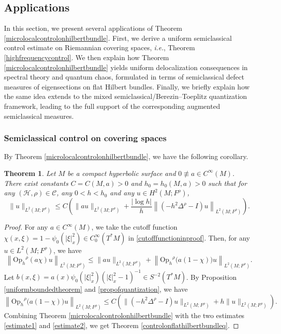 \documentclass[11pt,oneside,reqno]{amsart}
\newcommand\Oph{\ensuremath{\mathrm{Op}_h}}
\newtheorem{theorem}{Theorem}[section]
\theoremstyle{definition}
\numberwithin{equation}{section}
\theoremstyle{plain}
\begin{document}
\subsection{Applications}\label{subsec:application}

In this section, we present several applications of Theorem \ref{microlocalcontrolonhilbertbundle}. 
First, we derive a uniform semiclassical control estimate on Riemannian covering spaces, \emph{i.e.}, Theorem \ref{highfrequencycontrol}. 
We then explain how Theorem \ref{microlocalcontrolonhilbertbundle} yields uniform delocalization consequences in spectral theory and quantum chaos, formulated in terms of semiclassical defect measures of eigensections on flat Hilbert bundles. 
Finally, we briefly explain how the same idea extends to the mixed semiclassical/Berezin–Toeplitz quantization framework, leading to the full support of the corresponding augmented semiclassical measures.


\subsubsection{Semiclassical control on covering spaces}

By Theorem \ref{microlocalcontrolonhilbertbundle}, we have the following corollary.


\begin{theorem}\label{controlonflathilbertbundle}
Let $M$ be a compact hyperbolic surface and $0\not \equiv a \in C^{\infty}(M)$. There exist constants $C=C(M,a)>0$ and $h_{0}  = h_0(M,a)>0$ such that for any $(\mathcal{H},\rho)\in \mathcal{C}$, any $0<h<h_{0}$ and any $u \in H^2(M;F^{\rho})$,
\begin{equation}\label{controlonflathilbertbundleq}
\|u\|_{L^2(M;F^{\rho})} \leq C\left( \|au\|_{L^2(M;F^{\rho})}+\frac{|\log h|}{h}\left\|(-h^2 \Delta^{\rho}-I ) u\right\|_{L^2(M;F^{\rho})} \right).
\end{equation}
\end{theorem}

\begin{proof}
For any $a \in C^\infty(M)$, we take the cutoff function $\chi(x,\xi)=1-\psi_{0}(|\xi|^2_x)\in C_{0}^{\infty}(T^*M)$ in \eqref{cutofffunctioninproof}. Then, for any $u\in L^2(M;F^\rho)$, we have 
    \begin{equation}\label{estimate1}
        \left\| \Oph^{\rho}(a \chi )u\right\|_{L^2(M;F^\rho)}\leq \|a u\|_{L^2(M;F^\rho)}+\left\| \Oph^{\rho}\big(a(1- \chi)\big)u\right\|_{L^2(M;F^\rho)}.
    \end{equation}
Let $b(x,\xi)=a(x)\psi_0(|\xi|_x^2)(|\xi|_x^2-1)^{-1} \in S^{-2} (T^*M)$. By Proposition \ref{uniformboundedtheorem} and \ref{propofquantization}, we have
    \begin{equation}\label{estimate2}
        \left\| \Oph^{\rho}\big(a(1- \chi)\big)u\right\|_{L^2(M;F^\rho)}\leq C\left(\|(-h^2\Delta^{\rho}-I)u\|_{L^2(M;F^\rho)}+h\|u\|_{L^2(M;F^\rho)} \right).
    \end{equation}
Combining Theorem \ref{microlocalcontrolonhilbertbundle} with the two estimates \eqref{estimate1} and \eqref{estimate2}, we get Theorem \ref{controlonflathilbertbundleq}.
\end{proof}
\end{document}
